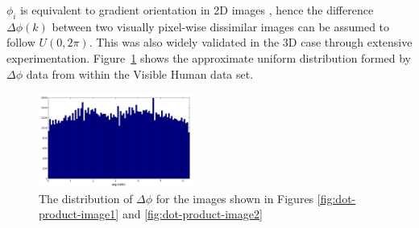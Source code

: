 $\phi_i$ is equivalent to gradient orientation in 2D images \cite{RefWorks:6}, hence the difference $\Delta \phi (k)$ between two visually pixel-wise dissimilar images can be assumed to follow $U(0, 2 \pi)$. This was also widely validated in the 3D case through extensive experimentation. Figure~\ref{fig:spherical-distribution} shows the approximate uniform distribution formed by $\Delta \phi$ data from within the Visible Human data set.
\begin{figure}[h!]
        \centering
        \includegraphics[width=0.45\textwidth]{images/spherical_hist}
        \caption{The distribution of $\Delta \phi$ for the images shown in Figures \ref{fig:dot-product-image1} and \ref{fig:dot-product-image2}}
        \label{fig:spherical-distribution}
\end{figure}

